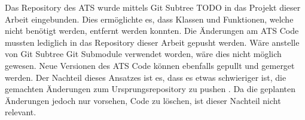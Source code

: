 Das Repository des \ac{ATS} wurde mittels Git Subtree TODO in das Projekt dieser Arbeit eingebunden. 
Dies ermöglichte es, dass Klassen und Funktionen, welche nicht benötigt werden, entfernt werden konnten.
Die Änderungen am \ac{ATS} Code mussten lediglich in das Repository dieser Arbeit gepusht werden.
Wäre anstelle von Git Subtree Git Submodule verwendet worden, wäre dies nicht möglich gewesen.
Neue Versionen des \ac{ATS} Code können ebenfalls gepullt und gemerget werden. 
Der Nachteil dieses Ansatzes ist es, dass es etwas schwieriger ist, die gemachten Änderungen zum Ursprungsrepository zu pushen \parencite{gitSubtree}.
Da die geplanten Änderungen jedoch nur vorsehen, Code zu löschen, ist dieser Nachteil nicht relevant.
